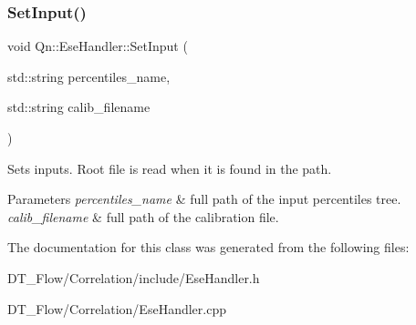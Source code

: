 \subsubsection{\texorpdfstring{Set\+Input()}{SetInput()}}
{\footnotesize\ttfamily void Qn\+::\+Ese\+Handler\+::\+Set\+Input (\begin{DoxyParamCaption}\item[{std\+::string}]{percentiles\+\_\+name,  }\item[{std\+::string}]{calib\+\_\+filename }\end{DoxyParamCaption})}

Sets inputs. Root file is read when it is found in the path. 
\begin{DoxyParams}{Parameters}
{\em percentiles\+\_\+name} & full path of the input percentiles tree. \\
\hline
{\em calib\+\_\+filename} & full path of the calibration file. \\
\hline
\end{DoxyParams}


The documentation for this class was generated from the following files\+:\begin{DoxyCompactItemize}
\item 
D\+T\+\_\+\+Flow/\+Correlation/include/Ese\+Handler.\+h\item 
D\+T\+\_\+\+Flow/\+Correlation/Ese\+Handler.\+cpp\end{DoxyCompactItemize}
